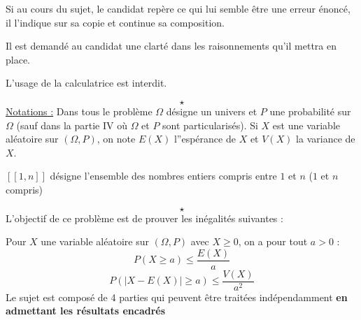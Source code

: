 

\usepackage{empheq}
\usepackage[c]{esvect}
\newcommand{\covec}[2]{\begin{pmatrix}#1 \\#2 \end{pmatrix}}




\flushleft
Si au cours du sujet, le candidat repère ce qui lui semble être une erreur énoncé, il l'indique sur sa copie et continue sa composition. \newline

Il est demandé au candidat une clarté dans les raisonnements qu'il mettra en place. \newline

L'usage de la calculatrice est interdit.\newline

$$\star$$
\underline{Notations :}\newline
Dans tous le problème $\Omega$ désigne un univers et $P$ une probabilité sur $\Omega$ (sauf dans la partie IV où $\Omega$ et $P$ sont particularisés). Si $X$ est une variable aléatoire sur $(\Omega,P)$, on note $E(X)$ l''espérance de $X$ et $V(X)$ la variance de $X$.\newline

$[\![1,n]\!]$ désigne l'ensemble des nombres entiers compris entre $1$ et $n$ ($1$ et $n$ compris)

$$\star$$
L'objectif de ce problème est de prouver les inégalités suivantes : \newline

Pour $X$ une variable aléatoire sur $(\Omega,P)$ avec $X \geq 0$, on a pour tout $a>0$ : 
$$P(X \geq a) \leq \frac{E(X)}{a}$$
$$P(|X-E(X)| \geq a) \leq \frac{V(X)}{a^2}$$
Le sujet est composé de 4 parties qui peuvent être traitées indépendamment \textbf{en admettant les résultats encadrés}\newline


